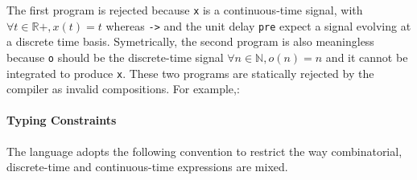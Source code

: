 \documentclass[11pt,titlepage,twoside]{report}
\newcommand{\bR}{\mathbb{R}}
\newcommand{\bN}{\mathbb{N}}
\newcommand{\Marc}[1]{{\bf Marc.} {#1} {\bf Fin}}
\newcommand{\Tim}[1]{{\bf Tim.} {#1} {\bf Fin}}
\begin{document}

The first program is rejected because \texttt{x} is a continuous-time
signal, with $\forall t \in \bR+, x(t) = t$ whereas \texttt{->} and
the unit delay \texttt{pre} expect a signal evolving at a discrete
time basis. Symetrically, the second program is also meaningless
because \verb-o- should be the discrete-time signal $\forall n \in
\bN, o(n) = n$ and it cannot be integrated to produce \verb-x-.
These two programs
are statically rejected by the compiler as invalid
compositions. For example,: \chklistingerr{}

\paragraph{Typing Constraints}

\newcommand{\AnyKind}{\mathtt{A}}
\newcommand{\NodeKind}{\mathtt{D}}
\newcommand{\HybridKind}{\mathtt{C}}

The language adopts the following convention to restrict the
way combinatorial, discrete-time and continuous-time expressions are mixed.
\end{document}
